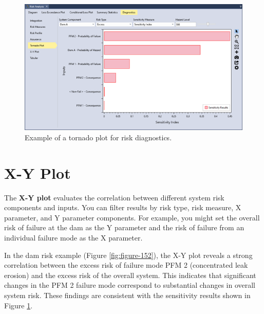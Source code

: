 \documentclass[
]{book}
\begin{document}
\begin{figure}

{\centering \includegraphics{images/figure151} 

}

\caption{Example of a tornado plot for risk diagnostics.}\label{fig:figure-151}
\end{figure}

\hypertarget{x-y-plot}{%
\section{X-Y Plot}\label{x-y-plot}}

The \textbf{X-Y plot} evaluates the correlation between different system risk components and inputs. You can filter results by risk type, risk measure, X parameter, and Y parameter components. For example, you might set the overall risk of failure at the dam as the Y parameter and the risk of failure from an individual failure mode as the X parameter.

In the dam risk example (Figure \ref{fig:figure-152}), the X-Y plot reveals a strong correlation between the excess risk of failure mode PFM 2 (concentrated leak erosion) and the excess risk of the overall system. This indicates that significant changes in the PFM 2 failure mode correspond to substantial changes in overall system risk. These findings are consistent with the sensitivity results shown in Figure \ref{fig:figure-151}.
\end{document}
